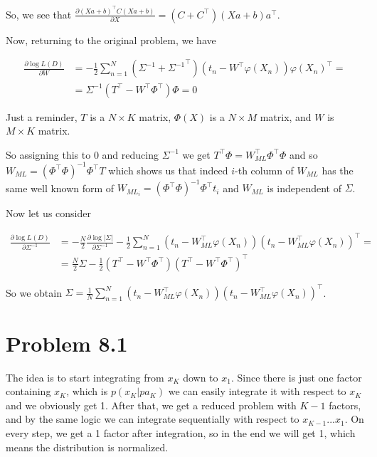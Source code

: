 \documentclass[fleqn]{article}
\begin{document}
So, we see that $\frac{\partial (Xa + b)^\top C (Xa + b)}{\partial X} = (C + C^\top)(Xa + b)a^\top$.

Now, returning to the original problem, we have 

\begin{align}\frac{\partial \log L(D)}{\partial W} & = -\frac{1}{2}\sum\limits_{n=1}^N(\Sigma^{-1} + {\Sigma^{-1}}^{\top})(t_n - W^\top \varphi(X_n))\varphi(X_n)^\top = \\ & = \Sigma^{-1} (T^\top - W^\top \varPhi^\top)\varPhi = 0
\end{align}

Just a reminder, $T$ is a $N \times K$ matrix, $\varPhi(X)$ is a $N \times M$ matrix, and $W$ is $M \times K$ matrix. 

So assigning this to 0 and reducing $\Sigma^{-1}$ we get $T^\top \varPhi = W_{ML}^\top \varPhi^\top \varPhi$ and so $W_{ML} =  (\varPhi^\top \varPhi)^{-1}\varPhi^\top T$ which shows us that indeed $i$-th column of $W_{ML}$ has the same well known form of $W_{ML_i}=(\varPhi^\top \varPhi)^{-1}\varPhi^\top t_i$ and $W_{ML}$ is independent of $\Sigma$.

Now let us consider 

\begin{align}\frac{\partial \log L(D)}{\partial \Sigma^{-1}} & = -\frac{N}{2}\frac{\partial\log|\Sigma|}{\partial\Sigma^{-1}} - \frac{1}{2}\sum\limits_{n=1}^N(t_n - W_{ML}^\top \varphi(X_n))(t_n - W_{ML}^\top \varphi(X_n))^\top = \\ & = \frac{N}{2} \Sigma - \frac{1}{2}(T^\top - W^\top \varPhi^\top)(T^\top - W^\top \varPhi^\top)^\top
\end{align}

So we obtain $\Sigma = \frac{1}{N}\sum\limits_{n=1}^N(t_n - W_{ML}^\top \varphi(X_n))(t_n - W_{ML}^\top \varphi(X_n))^\top$.

\section*{Problem 8.1}

The idea is to start integrating from $x_K$ down to $x_1$. Since there is just one factor containing $x_K$, which is $p(x_K|pa_K)$ we can easily integrate it with respect to $x_K$ and we obviously get 1. After that, we get a reduced problem with $K-1$ factors, and by the same logic we can integrate sequentially with respect to $x_{K-1}...x_1$. On every step, we get a 1 factor after integration, so in the end we will get 1, which means the distribution is normalized. 
\end{document}
